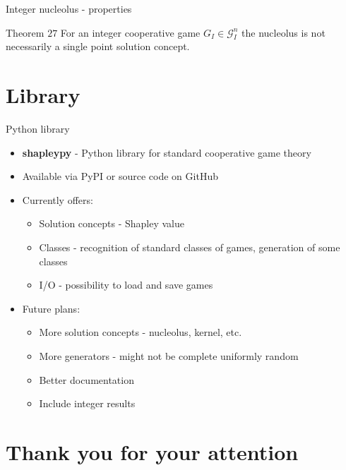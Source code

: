 \documentclass{beamer}
\begin{document}


\begin{frame}{Integer nucleolus - properties}
    \begin{block}{Theorem $27$}
        For an integer cooperative game $G_I \in \mathcal{G}_I^n$ the nucleolus is not necessarily a single point solution concept.
    \end{block}
\end{frame}



\section{Library}


\begin{frame}{Python library}

    \begin{itemize}
        \item \textbf{shapleypy} - Python library for standard cooperative game theory
        \item Available via PyPI or source code on GitHub
        \item Currently offers:
        \begin{itemize}
            \item Solution concepts - Shapley value
            \item Classes - recognition of standard classes of games, generation of some classes
            \item I/O - possibility to load and save games
        \end{itemize}
        \item Future plans:
        \begin{itemize}
            \item More solution concepts - nucleolus, kernel, etc.
            \item More generators - might not be complete uniformly random
            \item Better documentation
            \item Include integer results
        \end{itemize}
    \end{itemize}
    
\end{frame}


\section{Thank you for your attention}
\end{document}
